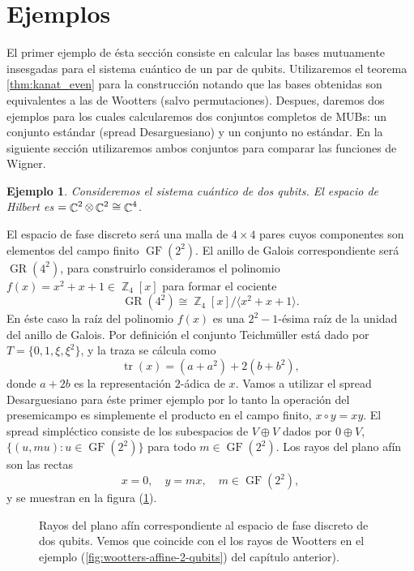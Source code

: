 \documentclass[a4paper]{report}
\DeclareMathOperator{\C}{\mathbb{C}}
\DeclareMathOperator{\Z}{\mathbb{Z}}
\let\H\relax
\DeclareMathOperator{\H}{\mathcal H}
\DeclareMathOperator{\tr}{tr}
\DeclareMathOperator{\GF}{GF}
\DeclareMathOperator{\GR}{GR}
\newtheorem{example}{Ejemplo}
\begin{document}
  \section{Ejemplos}

  El primer ejemplo de ésta sección consiste en calcular las
  bases mutuamente insesgadas para el sistema cuántico de un
  par de qubits. Utilizaremos el teorema
  \ref{thm:kanat_even} para la construcción notando que las
  bases obtenidas son equivalentes a las de Wootters (salvo
  permutaciones).  Despues, daremos dos ejemplos para los
  cuales calcularemos dos conjuntos completos de MUBs: un
  conjunto estándar (spread Desarguesiano) y un conjunto no
  estándar. En la siguiente sección utilizaremos ambos
  conjuntos para comparar las funciones de Wigner.

  \begin{example}
    Consideremos el sistema cuántico de dos qubits. El
    espacio de Hilbert es $\H = \C^2 \otimes \C^2 \cong
    \C^{4}$. 
  \end{example}
  El espacio de fase discreto será una malla de
  $4 \times 4$ pares cuyos componentes son elementos del
  campo finito $\GF(2^2)$. El anillo de Galois
  correspondiente será $\GR(4^{2})$, para construirlo
  consideramos el polinomio $f(x) = x^2+x+1 \in \Z_4[x]$
  para formar el cociente
  \[
    \GR(4^2) \cong \Z_4[x] / \langle x^2+x+1 \rangle.
  \] 
  En éste caso la raíz del polinomio $f(x)$ es una
  $2^{2}-1$-ésima raíz de la unidad del anillo de Galois.
  Por definición el conjunto Teichmüller está dado por $T =
  \{0,1,\xi,\xi^2\}$, y la traza se cálcula como
  \[
    \tr(x) = (a + a^2) + 2(b + b^2),
  \] 
  donde $a + 2b$ es la representación $2$-ádica de $x$.
  Vamos a utilizar el spread Desarguesiano para éste primer
  ejemplo por lo tanto la operación del presemicampo es
  simplemente el producto en el campo finito, $x \circ y =
  xy$. El spread simpléctico consiste de los subespacios de
  $V \oplus V$ dados por $0 \oplus V$, $\{(u, mu) : u \in
  \GF(2^2)\}$ para todo $m \in \GF(2^2)$.  Los rayos del
  plano afín son las rectas
  \[
    x = 0,
    \quad
    y = mx, \quad m \in \GF(2^2),
  \] 
  y se muestran en la figura (\ref{fig:2-2-desargues-plane}).
  \begin{figure}[ht]
    \centering
    \scalebox{0.8}{
      
    }
    \caption{Rayos del plano afín correspondiente al espacio
    de fase discreto de dos qubits. Vemos que coincide con
    el los rayos de Wootters en el ejemplo
    (\ref{fig:wootters-affine-2-qubits}) del capítulo
    anterior).}
    \label{fig:2-2-desargues-plane}
  \end{figure}
\end{document}
